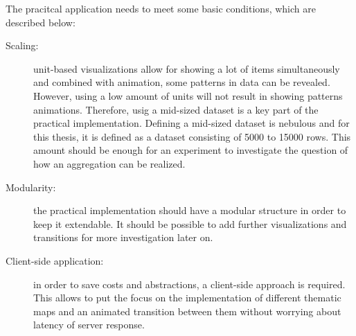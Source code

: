 The pracitcal application needs to meet some basic conditions, which are described below:

\begin{description}
\item[Scaling:] unit-based visualizations allow for showing a lot of items simultaneously and combined with animation, some patterns in data can be revealed. However, using a low amount of units will not result in showing patterns animations. Therefore, usig a mid-sized dataset is a key part of the practical implementation. Defining a mid-sized dataset is nebulous and for this thesis, it is defined as a dataset consisting of 5000 to 15000 rows. This amount should be enough for an experiment to investigate the question of how an aggregation can be realized.

\item[Modularity:] the practical implementation should have a modular structure in order to keep it extendable. It should be possible to add further visualizations and transitions for more investigation later on.

\item[Client-side application:] in order to save costs and abstractions, a client-side approach is required. This allows to put the focus on the implementation of different thematic maps and an animated transition between them without worrying about latency of server response.

\end{description}